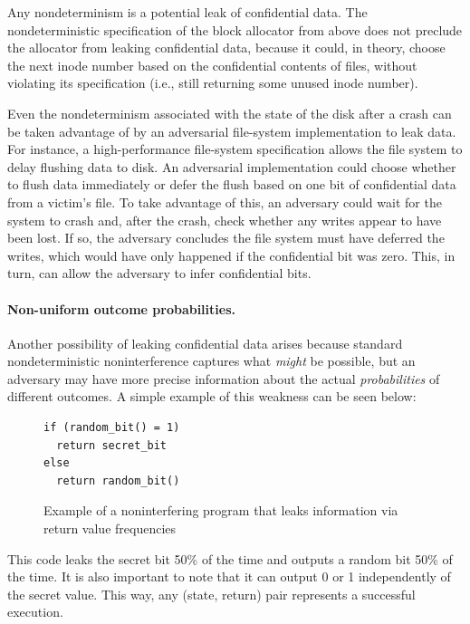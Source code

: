 Any nondeterminism is a potential leak of confidential data.  The
nondeterministic specification of the block allocator from above does not
preclude the allocator from leaking confidential data, because it could,
in theory, choose the next inode number based on the confidential contents
of files, without violating its specification (i.e., still returning some
unused inode number).

Even the nondeterminism associated with the state of the disk
after a crash can be taken advantage of by an adversarial file-system
implementation to leak data.  For instance, a high-performance
file-system specification allows the file system to delay flushing data
to disk.  An adversarial implementation could choose whether to flush
data immediately or defer the flush based on one bit of confidential
data from a victim's file.  To take advantage of this, an adversary
could wait for the system to crash and, after the crash, check whether
any writes appear to have been lost.  If so, the adversary concludes
the file system must have deferred the writes, which would have only
happened if the confidential bit was zero.  This, in turn, can allow
the adversary to infer confidential bits.

\paragraph{Non-uniform outcome probabilities.}
Another possibility of leaking confidential data
arises because standard nondeterministic noninterference
captures what \emph{might} be possible, but an adversary may have
more precise information about the actual \emph{probabilities} of
different outcomes. A simple example of this weakness can be seen below: 

\begin{figure}[ht]
    \centering
\begin{verbatim}
if (random_bit() = 1)
  return secret_bit
else
  return random_bit()
\end{verbatim}
    \caption{Example of a noninterfering program that leaks information via return value frequencies}
    \label{fig:Frequency_Leaking_Program}
\end{figure}

This code leaks the secret bit 50\% of the time and outputs a random bit 50\% of the time. It is also important to note that it can output 0 or 1 independently of the secret value. This way, any (state, return) pair represents a successful execution. 


